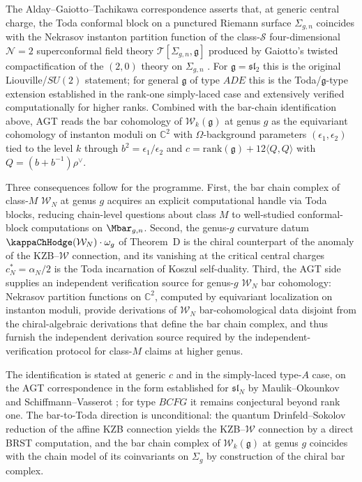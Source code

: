 \begin{remark}
The Alday--Gaiotto--Tachikawa correspondence \cite{AGT09} asserts that,
at generic central charge, the Toda conformal block on a punctured
Riemann surface $\Sigma_{g,n}$ coincides with the Nekrasov instanton
partition function of the class-$\mathcal{S}$ four-dimensional
$\mathcal{N} = 2$ superconformal field theory
$\mathcal{T}[\Sigma_{g,n}, \mathfrak{g}]$ produced by Gaiotto's
twisted compactification of the $(2,0)$ theory on $\Sigma_{g,n}$
\cite{Gai09}. For $\mathfrak{g} = \mathfrak{sl}_2$ this is the
original Liouville/$SU(2)$ statement; for general $\mathfrak{g}$ of
type $ADE$ this is the Toda/$\mathfrak{g}$-type extension
established in the rank-one simply-laced case and extensively verified
computationally for higher ranks. Combined with the
bar-chain identification above, AGT reads the bar cohomology of
$\mathcal{W}_k(\mathfrak{g})$ at genus $g$ as the equivariant
cohomology of instanton moduli on $\mathbb{C}^2$ with $\Omega$-background
parameters $(\epsilon_1, \epsilon_2)$ tied to the level $k$ through
$b^2 = \epsilon_1/\epsilon_2$ and $c = \mathrm{rank}(\mathfrak{g}) +
12 \langle Q, Q \rangle$ with $Q = (b + b^{-1})\rho^\vee$.

Three consequences follow for the programme. First, the bar chain
complex of class-$M$ $\mathcal{W}_N$ at genus $g$ acquires an explicit
computational handle via Toda blocks, reducing chain-level questions
about class $M$ to well-studied conformal-block computations on
$\Mbar_{g,n}$. Second, the genus-$g$ curvature datum
$\kappaChHodge(\mathcal{W}_N) \cdot \omega_g$ of Theorem~D is the chiral
counterpart of the anomaly of the KZB--$\mathcal{W}$ connection, and
its vanishing at the critical central charges $c^\ast_N = \alpha_N/2$
is the Toda incarnation of Koszul self-duality. Third, the AGT side
supplies an independent verification source for genus-$g$
$\mathcal{W}_N$ bar cohomology: Nekrasov partition functions on
$\mathbb{C}^2$, computed by equivariant localization on instanton
moduli, provide derivations of $\mathcal{W}_N$ bar-cohomological data
disjoint from the chiral-algebraic derivations that define the bar
chain complex, and thus furnish the independent derivation source
required by the independent-verification protocol for class-$M$
claims at higher genus.

The identification is stated at generic $c$ and in the simply-laced
type-$A$ case, on the AGT correspondence in the form established for
$\mathfrak{sl}_N$ by Maulik--Okounkov \cite{MO19} and Schiffmann--Vasserot
\cite{SV13}; for type $BCFG$ it remains conjectural beyond rank one.
The bar-to-Toda direction is unconditional: the quantum
Drinfeld--Sokolov reduction of the affine KZB connection yields the
KZB--$\mathcal{W}$ connection by a direct BRST computation, and the
bar chain complex of $\mathcal{W}_k(\mathfrak{g})$ at genus $g$
coincides with the chain model of its coinvariants on $\Sigma_g$ by
construction of the chiral bar complex.
\end{remark}

